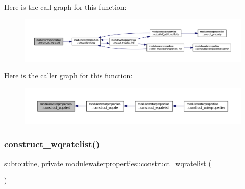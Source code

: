 Here is the call graph for this function\+:\nopagebreak
\begin{figure}[H]
\begin{center}
\leavevmode
\includegraphics[width=350pt]{namespacemodulewaterproperties_ab6c7c187dc0a1da19d043a98bcdde9ec_cgraph}
\end{center}
\end{figure}
Here is the caller graph for this function\+:\nopagebreak
\begin{figure}[H]
\begin{center}
\leavevmode
\includegraphics[width=350pt]{namespacemodulewaterproperties_ab6c7c187dc0a1da19d043a98bcdde9ec_icgraph}
\end{center}
\end{figure}
\mbox{\label{namespacemodulewaterproperties_abadbafe8dee3212a744771417b0c292a}} 
\subsubsection{\texorpdfstring{construct\+\_\+wqratelist()}{construct\_wqratelist()}}
{\footnotesize\ttfamily subroutine, private modulewaterproperties\+::construct\+\_\+wqratelist (\begin{DoxyParamCaption}{ }\end{DoxyParamCaption})\hspace{0.3cm}{\ttfamily [private]}}

